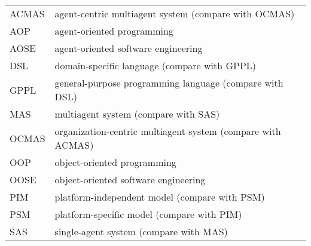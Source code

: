 

\begin{tabular}{ l l }
	ACMAS & agent-centric multiagent system (compare with OCMAS)\\
	AOP & agent-oriented programming\\
	AOSE & agent-oriented software engineering\\
  	DSL & domain-specific language (compare with GPPL)\\
	GPPL & general-purpose programming language (compare with DSL)\\
	MAS & multiagent system (compare with SAS)\\
	OCMAS & organization-centric multiagent system (compare with ACMAS)\\
	OOP & object-oriented programming\\
	OOSE & object-oriented software engineering\\
	PIM & platform-independent model (compare with PSM)\\
	PSM & platform-specific model (compare with PIM)\\
	SAS & single-agent system (compare with MAS)\\
\end{tabular}